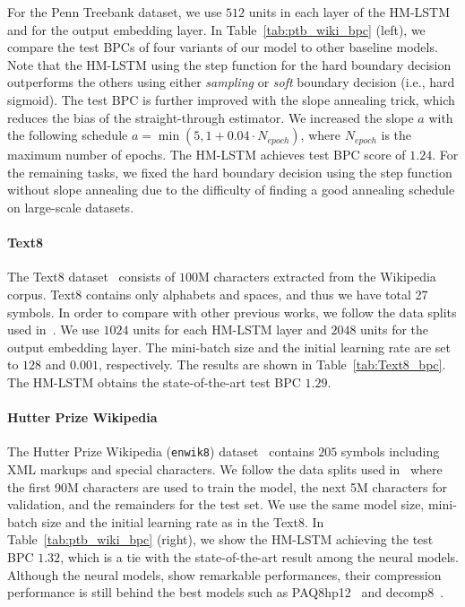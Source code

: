 For the Penn Treebank dataset, we use $512$ units in each layer of the HM-LSTM and for the output embedding layer. In Table~\ref{tab:ptb_wiki_bpc} (left), we compare the test BPCs of four variants of our model to other baseline models. Note that the HM-LSTM using the step function for the hard boundary decision outperforms the others using either {\it sampling} or {\it soft} boundary decision (i.e., hard sigmoid). The test BPC is further improved with the slope annealing trick, which reduces the bias of the straight-through estimator. We increased the slope $a$ with the following schedule {\small $a=\min\left(5, 1+0.04\cdot N_{epoch}\right)$},
where $N_{epoch}$ is the maximum number of epochs. The HM-LSTM achieves test BPC score of $1.24$. For the remaining tasks, we fixed the hard boundary decision using the step function without slope annealing due to the difficulty of finding a good annealing schedule on large-scale datasets.

\paragraph{Text8}
The Text8 dataset~\citep{mahoney2009large} consists of $100$M characters extracted from the Wikipedia corpus. Text8 contains only alphabets and spaces, and thus we have total 27 symbols. In order to compare with other previous works, we follow the data splits used in~\citet{mikolov2012subword}.
We use $1024$ units for each HM-LSTM layer and $2048$ units for the output embedding layer. The mini-batch size and the initial learning rate are set to $128$ and $0.001$, respectively. The results are shown in Table~\ref{tab:Text8_bpc}.
The HM-LSTM obtains the state-of-the-art test BPC $1.29$.

\paragraph{Hutter Prize Wikipedia} The Hutter Prize Wikipedia (\texttt{enwik8}) dataset~\citep{Hutter2012} contains $205$ symbols including XML markups and special characters. We follow the data splits used in~\citet{graves2013generating}
where the first 90M characters are used to train the model, the next 5M characters for validation, and the remainders for the test set. We use the same model size, mini-batch size and the initial learning rate as in the Text8. In Table~\ref{tab:ptb_wiki_bpc} (right), we show the HM-LSTM achieving the test BPC $1.32$, which is a tie with the state-of-the-art result among the neural models. Although the neural models, show remarkable performances, their compression performance is still behind the best models such as PAQ8hp12~\citep{mahoney2005adaptive} and decomp8~\citep{mahoney2009large}.

